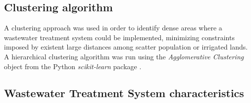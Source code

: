 



\subsection{Clustering algorithm}\label{Sc:clustering}
A clustering approach was used in order to identify dense areas where a wastewater treatment system could be implemented, minimizing constraints imposed by existent large distances among scatter population or irrigated lands. A hierarchical clustering  algorithm was run using the \textit{Agglomerative Clustering} object from the Python \textit{scikit-learn} package \cite{scikit-learn}.

\subsection{Wastewater Treatment System characteristics}

